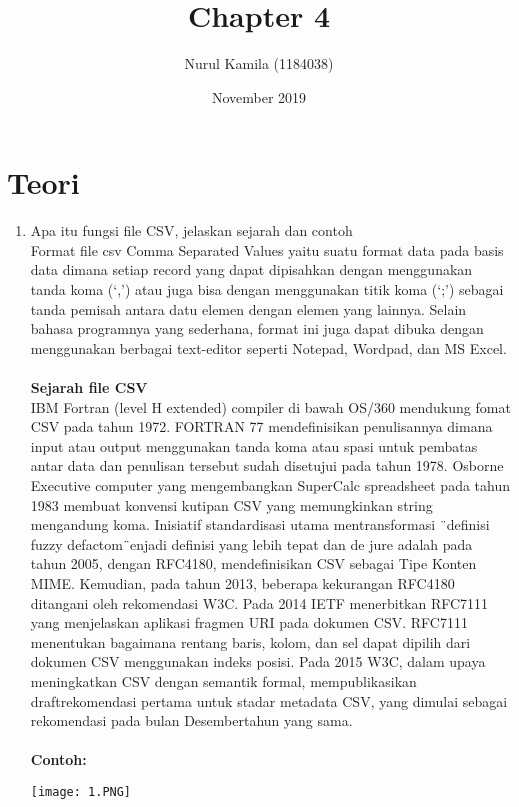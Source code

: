 \documentclass{article}
\title{Chapter 4}
\author{Nurul Kamila (1184038) }
\date{November 2019}
\begin{document}
\maketitle

\section{Teori}
\begin{enumerate}
    \item Apa itu fungsi ﬁle CSV, jelaskan sejarah dan contoh \\
    Format ﬁle csv Comma Separated Values yaitu suatu format data pada basis data dimana setiap record yang dapat dipisahkan dengan menggunakan tanda koma (‘,’) atau juga bisa dengan menggunakan titik koma (‘;’) sebagai tanda pemisah antara datu elemen dengan elemen yang lainnya. Selain bahasa programnya yang sederhana, format ini juga dapat dibuka dengan menggunakan berbagai text-editor seperti Notepad, Wordpad, dan MS Excel. \\
    \\
   \textbf{ Sejarah ﬁle CSV}\\
   IBM Fortran (level H extended) compiler di bawah OS/360 mendukung fomat CSV pada tahun 1972. FORTRAN 77 mendeﬁnisikan penulisannya dimana input atau output menggunakan tanda koma atau spasi untuk pembatas antar data dan penulisan tersebut sudah disetujui pada tahun 1978. Osborne Executive computer yang mengembangkan SuperCalc spreadsheet pada tahun 1983 membuat konvensi kutipan CSV yang memungkinkan string mengandung koma. Inisiatif standardisasi utama mentransformasi ¨deﬁnisi fuzzy defactom¨enjadi deﬁnisi yang lebih tepat dan de jure adalah pada tahun 2005, dengan RFC4180, mendeﬁnisikan CSV sebagai Tipe Konten MIME. Kemudian, pada tahun 2013, beberapa kekurangan RFC4180 ditangani oleh rekomendasi W3C. Pada 2014 IETF menerbitkan RFC7111 yang menjelaskan aplikasi fragmen URI pada dokumen CSV. RFC7111 menentukan bagaimana rentang baris, kolom, dan sel dapat dipilih dari dokumen CSV menggunakan indeks posisi. Pada 2015 W3C, dalam upaya meningkatkan CSV dengan semantik formal, mempublikasikan draftrekomendasi pertama untuk stadar metadata CSV, yang dimulai sebagai rekomendasi pada bulan Desembertahun yang sama.\\
   \\
  \textbf{ Contoh:}\\
  \begin{center}
    \texttt{[image: 1.PNG]}
    \end{center}


\end{enumerate}
\end{document}
